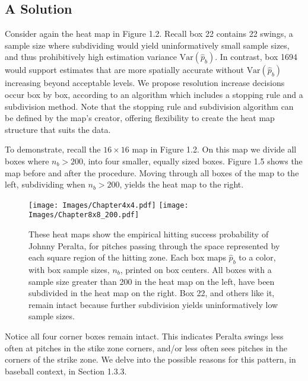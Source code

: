 \subsection{A Solution}

Consider again the heat map in Figure 1.2. Recall box 22 contains 22 swings, a sample size where subdividing would yield uninformatively small sample sizes, and thus prohibitively high estimation variance $\text{Var}(\hat{p}_{b})$. In contrast, box 1694 would support estimates that are more spatially accurate without $\text{Var}(\hat{p}_{b})$ increasing beyond acceptable levels. We propose resolution increase decisions occur box by box, according to an algorithm which includes a stopping rule and a subdivision method. Note that the stopping rule and subdivision algorithm can be defined by the map's creator, offering flexibility to create the heat map structure that suits the data. 

To demonstrate, recall the $16 \times 16$ map in Figure 1.2. On this map we divide all boxes where $n_{b} > 200$, into four smaller, equally sized boxes. Figure 1.5 shows the map before and after the procedure. Moving through all boxes of the map to the left, subdividing when $n_{b} > 200$, yields the heat map to the right.
        \begin{figure}[H]
      	\centering
      	\texttt{[image: Images/Chapter4x4.pdf]} 
      	\texttt{[image: Images/Chapter8x8\_200.pdf]} 
      	\caption{These heat maps show the empirical hitting success probability of Johnny Peralta, for pitches passing through the space represented by each square region of the hitting zone.  Each box maps $\hat{p}_{b}$ to a color, with box sample sizes, $n_{b}$, printed on box centers. All boxes with a sample size greater than 200 in the heat map on the left, have been subdivided in the heat map on the right. Box 22, and others like it, remain intact because further subdivision yields uninformatively low sample sizes.}
      	\end{figure} 
      	
Notice all four corner boxes remain intact. This indicates Peralta  swings less often at pitches in the stike zone corners, and/or less often sees pitches in the corners of the strike zone. We delve into the possible reasons for this pattern, in baseball context, in Section 1.3.3.

